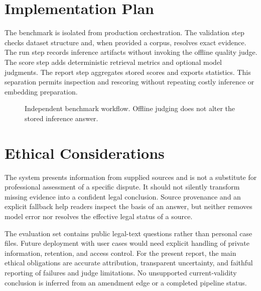 \clearpage
\section{Implementation Plan}
The benchmark is isolated from production orchestration. The validation step checks dataset structure and, when provided a corpus, resolves exact evidence. The run step records inference artifacts without invoking the offline quality judge. The score step adds deterministic retrieval metrics and optional model judgments. The report step aggregates stored scores and exports statistics. This separation permits inspection and rescoring without repeating costly inference or embedding preparation.

\begin{figure}[H]\centering
{}
\caption{Independent benchmark workflow. Offline judging does not alter the stored inference answer.}\label{fig:benchmark}
\end{figure}

\section{Ethical Considerations}
The system presents information from supplied sources and is not a substitute for professional assessment of a specific dispute. It should not silently transform missing evidence into a confident legal conclusion. Source provenance and an explicit fallback help readers inspect the basis of an answer, but neither removes model error nor resolves the effective legal status of a source.

The evaluation set contains public legal-text questions rather than personal case files. Future deployment with user cases would need explicit handling of private information, retention, and access control. For the present report, the main ethical obligations are accurate attribution, transparent uncertainty, and faithful reporting of failures and judge limitations. No unsupported current-validity conclusion is inferred from an amendment edge or a completed pipeline status.
